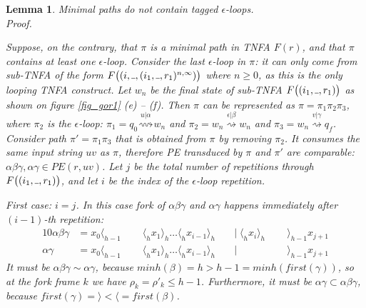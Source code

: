 \documentclass[AMA,STIX1COL]{WileyNJD-v2}
\newcommand{\Xl}{\langle}
\newcommand{\Xr}{\rangle}
\newcommand{\Xund}{\rule{.4em}{.4pt}}
\newtheorem{XLem}{Lemma}
\begin{document}
    \begin{XLem}\label{gor1_minpaths}
    Minimal paths do not contain tagged $\epsilon$-loops.
    \\
    Proof.

    Suppose, on the contrary, that $\pi$ is a minimal path in TNFA $F(r)$, and that $\pi$ contains at least one $\epsilon$-loop.
    Consider the \emph{last} $\epsilon$-loop in $\pi$:
    it can only come from sub-TNFA of the form $F\big( (i, \Xund, (i_1, \Xund, r_1)^{n,\infty}) \big)$ where $n \geq 0$,
    as this is the only looping TNFA construct.
    Let $w_n$ be the final state of sub-TNFA $F\big( (i_1, \Xund, r_1) \big)$
    as shown on figure \ref{fig_gor1} (e) -- (f).
    Then $\pi$ can be represented as
    $\pi = \pi_1 \pi_2 \pi_3$, where $\pi_2$ is the $\epsilon$-loop:
    $\pi_1 = q_0 \overset {u | \alpha} {\rightsquigarrow} w_n$ and
    $\pi_2 = w_n \overset {\epsilon | \beta} {\rightsquigarrow} w_n$ and
    $\pi_3 = w_n \overset {v | \gamma} {\rightsquigarrow} q_f$.
    Consider path $\pi' = \pi_1 \pi_3$ that is obtained from $\pi$ by removing $\pi_2$.
    It consumes the same input string $uv$ as $\pi$,
    therefore PE transduced by $\pi$ and $\pi'$ are comparable: $\alpha \beta \gamma, \alpha \gamma \in PE(r, uv)$.
    Let $j$ be the total number of repetitions through $F\big( (i_1, \Xund, r_1) \big)$,
    and let $i$ be the index of the $\epsilon$-loop repetition.

    First case: $i = j$.
    In this case fork of $\alpha \beta \gamma$ and $\alpha \gamma$ happens immediately after $(i-1)$-th repetition:
    \begin{alignat*}{10}
        \alpha \beta \gamma &= x_0 \Xl_{h-1} \;&&\; \Xl_h x_1 \Xr_h \hdots \Xl_h x_{i-1} \Xr_h \;&&\big|\; \Xl_h x_{i} \Xr_h \;&&\; \Xr_{h-1} x_{j+1} \\[-0.5em]
        \alpha \gamma       &= x_0 \Xl_{h-1} \;&&\; \Xl_h x_1 \Xr_h \hdots \Xl_h x_{i-1} \Xr_h \;&&\big|\;                   \;&&\; \Xr_{h-1} x_{j+1}
    \end{alignat*}
    It must be $\alpha \beta \gamma \sim \alpha \gamma$,
    because $minh (\beta) = h > h - 1 = minh (first (\gamma))$,
    so at the fork frame $k$ we have $\rho_k = \rho'_k \leq h - 1$.
    Furthermore, it must be $\alpha \gamma \subset \alpha \beta \gamma$,
    because $first (\gamma) = \Xr < \Xl = first (\beta)$.


\end{XLem}
\end{document}
